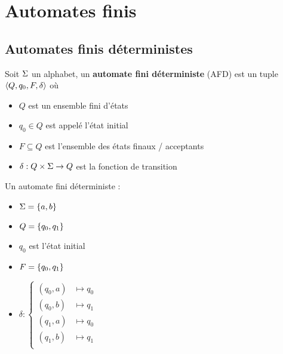 
\section{Automates finis}

\subsection{Automates finis déterministes}

\begin{definition}
	Soit $\Sigma$ un alphabet, un \textbf{automate fini déterministe} (AFD) est un tuple $\langle Q, q_0, F, \delta \rangle$ où
	\begin{itemize}
		\item $Q$ est un ensemble fini d'états
		\item $q_0 \in Q$ est appelé l'état initial
		\item $F \subseteq Q$ est l'ensemble des états finaux / acceptants
		\item $\delta : Q \times \Sigma \to Q$ est la fonction de transition
	\end{itemize}
\end{definition}


\begin{exemple} Un automate fini déterministe :

	\vspace{0.5cm}
	\begin{minipage}{0.5\textwidth}
		\begin{itemize}
			\item $\Sigma = \left\{a, b\right\}$
			\item $Q = \left\{q_0, q_1\right\}$
			\item $q_0$ est l'état initial
			\item $F = \left\{q_0, q_1\right\}$
			\item $\delta :
				      \left\{
				      \begin{array}{cc}
					      (q_0, a) & \mapsto q_0 \\
					      (q_0, b) & \mapsto q_1 \\
					      (q_1, a) & \mapsto q_0 \\
					      (q_1, b) & \mapsto q_1 \\
				      \end{array}
				      \right.$
		\end{itemize}
	\end{minipage}
	\begin{minipage}{0.5\textwidth}
		\begin{automata}
		\end{automata}
	\end{minipage}
\end{exemple}

